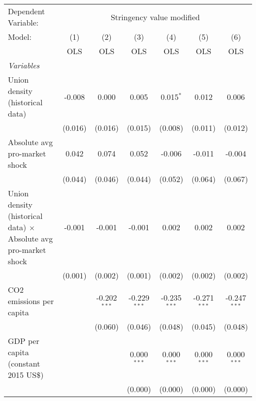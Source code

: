 
\begingroup
\centering
\begin{tabular}{lcccccc}
   \toprule
   Dependent Variable: & \multicolumn{6}{c}{Stringency value modified}\\
   Model:                                                                  & (1)     & (2)            & (3)            & (4)            & (5)            & (6)\\  
                                                                           &  OLS    & OLS            & OLS            & OLS            & OLS            & OLS\\  
   \midrule
   \emph{Variables}\\
   Union density (historical data)                                         & -0.008  & 0.000          & 0.005          & 0.015$^{*}$    & 0.012          & 0.006\\   
                                                                           & (0.016) & (0.016)        & (0.015)        & (0.008)        & (0.011)        & (0.012)\\   
   Absolute avg pro-market shock                                           & 0.042   & 0.074          & 0.052          & -0.006         & -0.011         & -0.004\\   
                                                                           & (0.044) & (0.046)        & (0.044)        & (0.052)        & (0.064)        & (0.067)\\   
   Union density (historical data) $\times$ Absolute avg pro-market shock  & -0.001  & -0.001         & -0.001         & 0.002          & 0.002          & 0.002\\   
                                                                           & (0.001) & (0.002)        & (0.001)        & (0.002)        & (0.002)        & (0.002)\\   
   CO2 emissions per capita                                                &         & -0.202$^{***}$ & -0.229$^{***}$ & -0.235$^{***}$ & -0.271$^{***}$ & -0.247$^{***}$\\   
                                                                           &         & (0.060)        & (0.046)        & (0.048)        & (0.045)        & (0.048)\\   
   GDP per capita (constant 2015 US\$)                                     &         &                & 0.000$^{***}$  & 0.000$^{***}$  & 0.000$^{***}$  & 0.000$^{***}$\\   
                                                                           &         &                & (0.000)        & (0.000)        & (0.000)        & (0.000)\\   

\end{tabular}
